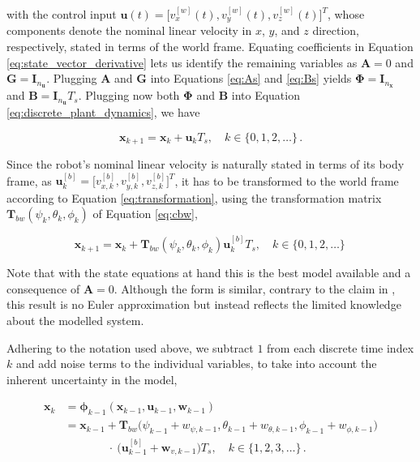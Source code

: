 \noindent
with the control input $\bm{u}(t) = \big[v_x^{[w]}(t), v_y^{[w]}(t), v_z^{[w]}(t)\big]^T$, whose components denote the nominal linear velocity in $x$, $y$, and $z$ direction, respectively, stated in terms of the world frame. Equating coefficients in Equation \ref{eq:state_vector_derivative} lets us identify the remaining variables as $\bm{A} = 0$ and $\bm{G} = \bm{I}_{n_{\bm{u}}}$. Plugging $\bm{A}$ and $\bm{G}$ into Equations \ref{eq:As} and \ref{eq:Bs} yields $\bm{\Phi} = \bm{I}_{n_{\bm{x}}}$ and $\bm{B} = \bm{I}_{n_{\bm{u}}} T_s$. Plugging now both $\bm{\Phi}$ and $\bm{B}$ into Equation \ref{eq:discrete_plant_dynamics}, we have

\begin{equation}
  \bm{x}_{k + 1} = \bm{x}_k + \bm{u}_k T_s, \quad k \in \{0, 1, 2, \dots\}\,.
\end{equation}

Since the robot's nominal linear velocity is naturally stated in terms of its body frame, as $\bm{u}^{[b]}_k = \big[v_{x, k}^{[b]}, v_{y, k}^{[b]}, v_{z, k}^{[b]}\big]^T$, it has to be transformed to the world frame according to Equation \ref{eq:transformation}, using the transformation matrix $\bm{T}_{bw}(\psi_k, \theta_k, \phi_k)$ of Equation \ref{eq:cbw},

\begin{equation}
  \bm{x}_{k + 1} = \bm{x}_k + \bm{T}_{bw}(\psi_k, \theta_k, \phi_k) \bm{u}^{[b]}_k T_s, \quad k \in \{0, 1, 2, \dots\}\,
\end{equation}

\noindent
Note that with the state equations at hand this is the best model available and a consequence of $\bm{A} = 0$. Although the form is similar, contrary to the claim in \cite{nicol2017}, this result is no Euler approximation but instead reflects the limited knowledge about the modelled system.
 
 Adhering to the notation used above, we subtract $1$ from each discrete time index $k$ and add noise terms to the individual variables, to take into account the inherent uncertainty in the model,

\begin{equation}\label{eq:system_model_euler}
\begin{split}
  \bm{x}_{k} &= \bm{\phi}_{k-1}(\bm{x}_{k-1}, \bm{u}_{k-1}, \bm{w}_{k-1}) \\
  &= \bm{x}_{k-1} + \bm{T}_{bw}\big(\psi_{k-1} + w_{\psi, {k-1}}, \theta_{k-1} + w_{\theta,{k-1}}, \phi_{k-1} + w_{\phi,{k-1}}\big) \\
  &\mathrel{\phantom{= \bm{x}_{k-1}}}\: \cdot \: \big(\bm{u}^{[b]}_{k-1} + \bm{w}_{v, {k-1}}\big) T_s, \quad k \in \{1, 2, 3, \dots\}\,.
  \end{split}
\end{equation}

